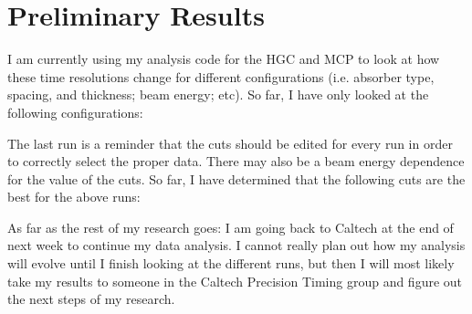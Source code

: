 \documentclass[12pt]{article}
\begin{document}
\section{Preliminary Results}
I am currently using my analysis code for the HGC and MCP to look at how these time resolutions change for different configurations (i.e. absorber type, spacing, and thickness; beam energy; etc). 
So far, I have only looked at the following configurations:


The last run is a reminder that the cuts should be edited for every run in order to correctly select the proper data. 
There may also be a beam energy dependence for the value of the cuts. 
So far, I have determined that the following cuts are the best for the above runs:


As far as the rest of my research goes: I am going back to Caltech at the end of next week to continue my data analysis. 
I cannot really plan out how my analysis will evolve until I finish looking at the different runs, but then I will most likely take my results to someone in the Caltech Precision Timing group and figure out the next steps of my research. 
\end{document}
